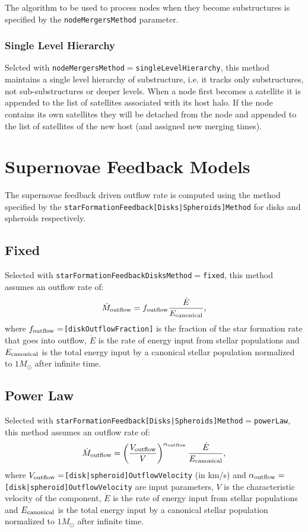 The algorithm to be used to process nodes when they become substructures is specified by the {\tt nodeMergersMethod} parameter.

\subsubsection{Single Level Hierarchy}

Selcted with {\tt nodeMergersMethod}$=${\tt singleLevelHierarchy}, this method maintains a single level hierarchy of substructure, i.e. it tracks only substructures, not sub-substructures or deeper levels. When a \gls{node} first becomes a satellite it is appended to the list of satellites associated with its host halo. If the \gls{node} contains its own satellites they will be detached from the \gls{node} and appended to the list of satellites of the new host (and assigned new merging times).

\section{Supernovae Feedback Models}\label{sec:sneFeedback}

The supernovae feedback driven outflow rate is computed using the method specified by the {\tt starFormationFeedback[Disks|Spheroids]Method} for disks and spheroids respectively.

\subsection{Fixed}

Selected with {\tt starFormationFeedbackDisksMethod}$=${\tt fixed}, this method assumes an outflow rate of:
\begin{equation}
 \dot{M}_{\rm outflow} = f_{\rm outflow} {\dot{E} \over E_{\rm canonical}},
\end{equation}
where $f_{\rm outflow}=${\tt [diskOutflowFraction]} is the fraction of the star formation rate that goes into outflow, $\dot{E}$ is the rate of energy input from stellar populations and $E_{\rm canonical}$ is the total energy input by a canonical stellar population normalized to $1 M_\odot$ after infinite time.

\subsection{Power Law}

Selected with {\tt starFormationFeedback[Disks|Spheroids]Method}$=${\tt powerLaw}, this method assumes an outflow rate of:
\begin{equation}
 \dot{M}_{\rm outflow} = \left({V_{\rm outflow} \over V}\right)^{\alpha_{\rm outflow}} {\dot{E} \over E_{\rm canonical}},
\end{equation}
where $V_{\rm outflow}=${\tt [disk|spheroid]OutflowVelocity} (in km/s) and $\alpha_{\rm outflow}=${\tt [disk|spheroid]OutflowVelocity} are input parameters, $V$ is the characteristic velocity of the component, $\dot{E}$ is the rate of energy input from stellar populations and $E_{\rm canonical}$ is the total energy input by a canonical stellar population normalized to $1 M_\odot$ after infinite time.

